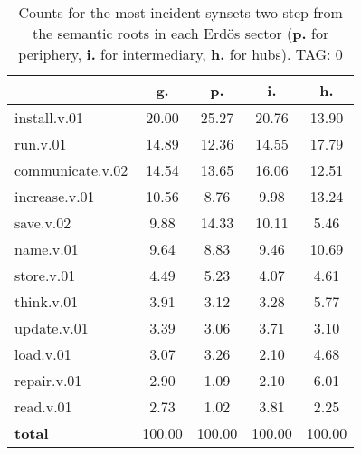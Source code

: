 \begin{table}[h!]
\begin{center}
\begin{tabular}{| l || c | c | c | c |}\hline
 & {\bf g.} & {\bf p.} & {\bf i.} & {\bf h.} \\\hline\hline
install.v.01 & 20.00  & 25.27  & 20.76  & 13.90 \\\hline
run.v.01 & 14.89  & 12.36  & 14.55  & 17.79 \\\hline
communicate.v.02 & 14.54  & 13.65  & 16.06  & 12.51 \\\hline
increase.v.01 & 10.56  & 8.76  & 9.98  & 13.24 \\\hline
save.v.02 & 9.88  & 14.33  & 10.11  & 5.46 \\\hline
name.v.01 & 9.64  & 8.83  & 9.46  & 10.69 \\\hline
store.v.01 & 4.49  & 5.23  & 4.07  & 4.61 \\\hline
think.v.01 & 3.91  & 3.12  & 3.28  & 5.77 \\\hline
update.v.01 & 3.39  & 3.06  & 3.71  & 3.10 \\\hline
load.v.01 & 3.07  & 3.26  & 2.10  & 4.68 \\\hline
repair.v.01 & 2.90  & 1.09  & 2.10  & 6.01 \\\hline
read.v.01 & 2.73  & 1.02  & 3.81  & 2.25 \\\hline\hline
{{\bf total}} & 100.00  & 100.00  & 100.00  & 100.00 \\\hline
\end{tabular}
\caption{Counts for the most incident synsets two step from the semantic roots in each Erd\"os sector ({\bf p.} for periphery, {\bf i.} for intermediary, {\bf h.} for hubs). TAG: 0}
\end{center}
\end{table}